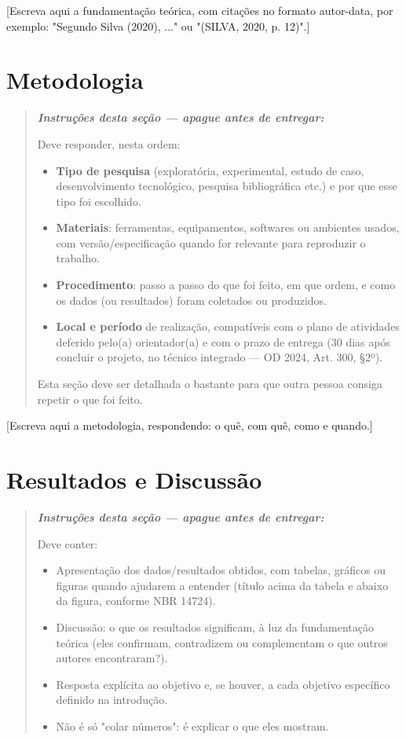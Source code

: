 \documentclass[article,12pt,a4paper,oneside]{abntex2}
\newenvironment{instrucoes}{%
  \begin{quotation}\footnotesize\itshape
  \noindent\textbf{\upshape Instruções desta seção — apague antes de entregar:}\par\smallskip
}{%
  \end{quotation}
}
\begin{document}
[Escreva aqui a fundamentação teórica, com citações no formato autor-data, por
exemplo: "Segundo Silva (2020), ..." ou "(SILVA, 2020, p. 12)".]

\section{Metodologia}

\begin{instrucoes}
Deve responder, nesta ordem:
\begin{itemize}
  \item \textbf{Tipo de pesquisa} (exploratória, experimental, estudo de caso, desenvolvimento tecnológico, pesquisa bibliográfica etc.) e por que esse tipo foi escolhido.
  \item \textbf{Materiais}: ferramentas, equipamentos, softwares ou ambientes usados, com versão/especificação quando for relevante para reproduzir o trabalho.
  \item \textbf{Procedimento}: passo a passo do que foi feito, em que ordem, e como os dados (ou resultados) foram coletados ou produzidos.
  \item \textbf{Local e período} de realização, compatíveis com o plano de atividades deferido pelo(a) orientador(a) e com o prazo de entrega (30 dias após concluir o projeto, no técnico integrado — OD 2024, Art. 300, §2º).
\end{itemize}
Esta seção deve ser detalhada o bastante para que outra pessoa consiga repetir o que foi feito.
\end{instrucoes}

[Escreva aqui a metodologia, respondendo: o quê, com quê, como e quando.]

\section{Resultados e Discussão}

\begin{instrucoes}
Deve conter:
\begin{itemize}
  \item Apresentação dos dados/resultados obtidos, com tabelas, gráficos ou figuras quando ajudarem a entender (título acima da tabela e abaixo da figura, conforme NBR 14724).
  \item Discussão: o que os resultados significam, à luz da fundamentação teórica (eles confirmam, contradizem ou complementam o que outros autores encontraram?).
  \item Resposta explícita ao objetivo e, se houver, a cada objetivo específico definido na introdução.
  \item Não é só "colar números": é explicar o que eles mostram.
\end{itemize}
\end{instrucoes}
\end{document}
